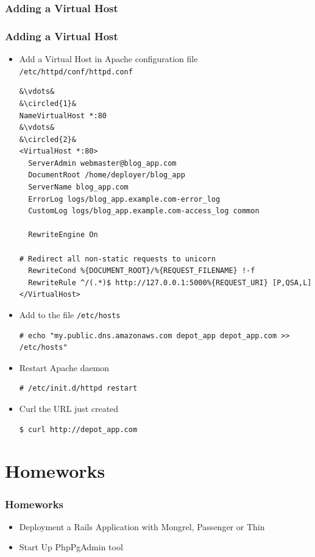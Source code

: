 \documentclass{beamer}
\newcommand*\circled[1]{\tikz[baseline=(char.base)]{
            \node[shape=circle,draw,inner sep=2pt] (char) {#1};}}
\begin{document}
\subsubsection{Adding a Virtual Host}
\begin{frame}
\frametitle{Adding a Virtual Host}
\begin{itemize}
 \item  Add a Virtual Host in Apache configuration file \texttt{/etc/httpd/conf/httpd.conf}

\lstset{language=shell, escapechar=&, numbers=left}
\begin{lstlisting}
&\vdots&
&\circled{1}&
NameVirtualHost *:80
&\vdots&
&\circled{2}&
<VirtualHost *:80>
  ServerAdmin webmaster@blog_app.com
  DocumentRoot /home/deployer/blog_app
  ServerName blog_app.com
  ErrorLog logs/blog_app.example.com-error_log
  CustomLog logs/blog_app.example.com-access_log common

  RewriteEngine On

# Redirect all non-static requests to unicorn
  RewriteCond %{DOCUMENT_ROOT}/%{REQUEST_FILENAME} !-f 
  RewriteRule ^/(.*)$ http://127.0.0.1:5000%{REQUEST_URI} [P,QSA,L]
</VirtualHost>
\end{lstlisting}

\item Add to the file \texttt{/etc/hosts}
\lstset{language=shell, escapechar=&}
\begin{lstlisting}
# echo "my.public.dns.amazonaws.com depot_app depot_app.com >> /etc/hosts" 
\end{lstlisting}

\item Restart Apache daemon

\lstset{language=shell, escapechar=!}
\begin{lstlisting}[escapechar=!]
# /etc/init.d/httpd restart
\end{lstlisting}

\item Curl the URL just created

\begin{lstlisting}[escapechar=!]
$ curl http://depot_app.com
\end{lstlisting} 

\end{itemize}

\end{frame}

\section{Homeworks}
\begin{frame}
  \frametitle{Homeworks}
  \begin{itemize}
    \item Deployment a Rails Application with Mongrel, Passenger or Thin
    \item Start Up PhpPgAdmin tool
  \end{itemize}
\end{frame}
\end{document}
